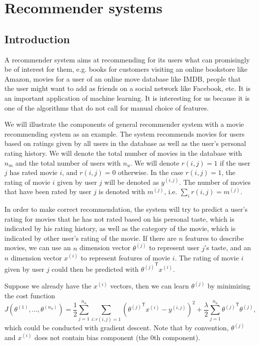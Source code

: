 \section{Recommender systems}
\subsection{Introduction}
A recommender system aims at recommending for its users what can promisingly be of interest for them, e.g. books for customers visiting an online bookstore like Amazon, movies for a user of an online move database like IMDB, people that the user might want to add as friends on a social network like Facebook, etc. It is an important application of machine learning. It is interesting for us because it is one of the algorithms that do not call for manual choice of features.

We will illustrate the components of general recommender system with a movie recommending system as an example. The system recommends movies for users based on ratings given by all users in the database as well as the user's personal rating history. We will denote the total number of movies in the database with $n_m$ and the total number of users with $n_u$. We will denote $r(i,j) = 1$ if the user $j$ has rated movie $i$, and $r(i,j) = 0$ otherwise. In the case $r(i,j) = 1$, the rating of movie $i$ given by user $j$ will be denoted as $y^{(i,j)}$. The number of movies that have been rated by user $j$ is denoted with $m^{(j)}$, i.e. $\sum\limits_{i}r(i,j) = m^{(j)}$.

In order to make correct recommendation, the system will try to predict a user's rating for movies that he has not rated based on his personal taste, which is indicated by his rating history, as well as the category of the movie, which is indicated by other user's rating of the movie. If there are $n$ features to describe movies, we can use an $n$ dimension vector $\theta^{(j)}$ to represent user $j$'s taste, and an $n$ dimension vector $x^{(i)}$ to represent features of movie $i$. The rating of movie $i$ given by user $j$ could then be predicted with ${\theta^{(j)}}^{\mathsf T}x^{(i)}$.

Suppose we already have the $x^{(i)}$ vectors, then we can learn $\theta^{(j)}$ by minimizing the cost function
\begin{equation*}
J(\theta^{(1)},\dots,\theta^{(n_u)}) = \frac{1}{2}
\sum\limits_{j=1}^{n_u}\sum\limits_{i:r(i,j)=1}\left({\theta^{(j)}}^{\mathsf T}x^{(i)}-y^{(i,j)}\right)^2 + \frac{\lambda}{2}\sum\limits_{j=1}^{n_u}{\theta^{(j)}}^{\mathsf T}\theta^{(j)},
\end{equation*}
which could be conducted with gradient descent. Note that by convention, $\theta^{(j)}$ and $x^{(i)}$ does not contain bias component (the 0th component).

